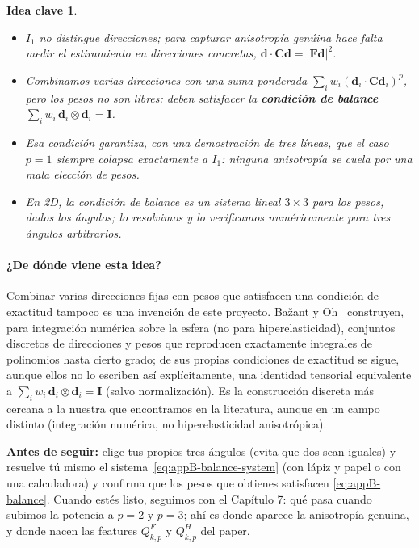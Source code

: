 \documentclass[11pt,a4paper]{article}
\newtheorem{takeaway}{Idea clave}
\begin{document}
\begin{takeaway}
\begin{itemize}
\item $I_1$ no distingue direcciones; para capturar anisotrop\'ia
gen\'uina hace falta medir el estiramiento en direcciones concretas,
$\bm d\cdot\bm C\bm d=|\bm F\bm d|^2$.
\item Combinamos varias direcciones con una suma ponderada
$\sum_i w_i(\bm d_i\cdot\bm C\bm d_i)^p$, pero los pesos no son
libres: deben satisfacer la \textbf{condici\'on de balance}
$\sum_i w_i\,\bm d_i\otimes\bm d_i=\bm I$.
\item Esa condici\'on garantiza, con una demostraci\'on de tres
l\'ineas, que el caso $p=1$ siempre colapsa exactamente a $I_1$:
ninguna anisotrop\'ia se cuela por una mala elecci\'on de pesos.
\item En 2D, la condici\'on de balance es un sistema lineal
$3\times3$ para los pesos, dados los \'angulos; lo resolvimos y lo
verificamos num\'ericamente para tres \'angulos arbitrarios.
\end{itemize}
\end{takeaway}

\paragraph{¿De d\'onde viene esta idea?} Combinar varias direcciones
fijas con pesos que satisfacen una condici\'on de exactitud tampoco es
una invenci\'on de este proyecto. Ba\v{z}ant y Oh~\cite{BazantOh1986}
construyen, para integraci\'on num\'erica sobre la esfera (no para
hiperelasticidad), conjuntos discretos de direcciones y pesos que
reproducen exactamente integrales de polinomios hasta cierto grado; de
sus propias condiciones de exactitud se sigue, aunque ellos no lo
escriben as\'i expl\'icitamente, una identidad tensorial equivalente a
$\sum_i w_i\,\bm d_i\otimes\bm d_i=\bm I$ (salvo normalizaci\'on). Es la
construcci\'on discreta m\'as cercana a la nuestra que encontramos en la
literatura, aunque en un campo distinto (integraci\'on num\'erica, no
hiperelasticidad anisotr\'opica).

\bigskip
\noindent\textbf{Antes de seguir:} elige tus propios tres \'angulos
(evita que dos sean iguales) y resuelve t\'u mismo el
sistema~\eqref{eq:appB-balance-system} (con l\'apiz y papel o con una
calculadora) y confirma que los pesos que obtienes satisfacen
\eqref{eq:appB-balance}. Cuando est\'es listo, seguimos con el
Cap\'itulo 7: qu\'e pasa cuando subimos la potencia a $p=2$ y $p=3$;
ah\'i es donde aparece la anisotrop\'ia genuina, y donde nacen las
features $Q^F_{k,p}$ y $Q^H_{k,p}$ del paper.
\end{document}
